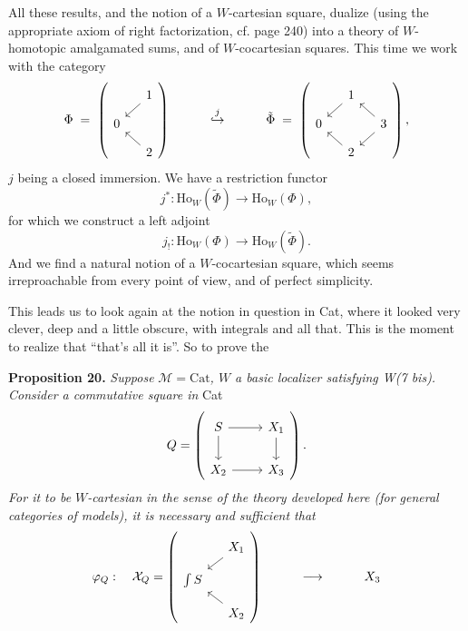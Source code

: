 \documentclass[11pt]{article}
\newcommand{\printedpage}[1]{\marginpar{\footnotesize p.~#1}}
\newcommand{\msp}[1]{\marginpar{\footnotesize [#1]}}
\newcommand{\Ho}{\mathrm{Ho}}
\begin{document}
\printedpage{170}

All these results, and the notion of a $W$-cartesian square, dualize (using the appropriate axiom of right factorization, cf. page 240) into a theory of $W$-homotopic amalgamated sums, and of $W$-cocartesian squares. This time we work with the category
\[
\Phi \;=\; \left(
\begin{tikzcd}[ampersand replacement=\&, row sep=small, column sep=small]
 \& 1 \arrow[dl] \\
0 \& \\
 \& 2 \arrow[ul]
\end{tikzcd}
\right)
\qquad\quad \overset{j}{\hookrightarrow} \qquad\quad
\tilde{\Phi} \;=\; \left(
\begin{tikzcd}[ampersand replacement=\&, row sep=small, column sep=small]
 \& 1 \arrow[dl] \& \\
0 \& \& 3 \arrow[ul] \arrow[dl] \\
 \& 2 \arrow[ul] \&
\end{tikzcd}
\right),
\]
$j$ being a closed immersion. We have a restriction functor
\[
j^* : \Ho_W(\tilde{\Phi}) \longrightarrow \Ho_W(\Phi),
\]
for which we construct a left adjoint
\[
j_! : \Ho_W(\Phi) \longrightarrow \Ho_W(\tilde{\Phi}).
\]
And we find a natural notion of a
\msp{page 262}
$W$-cocartesian square, which seems irreproachable from every point of view, and of perfect simplicity. %

This leads us to look again at the notion in question in Cat, where it looked very clever, deep and a little obscure, with integrals and all that. This is the moment to realize that ``that's all it is''. So to prove the

\textbf{Proposition 20.} \textit{Suppose} $\mathcal{M} = \mathrm{Cat}$\textit{, $W$ a basic localizer satisfying W(7 bis). Consider a commutative square in} Cat
\[
Q = \left(
\begin{tikzcd}[ampersand replacement=\&]
S \arrow[r] \arrow[d] \& X_1 \arrow[d] \\
X_2 \arrow[r] \& X_3
\end{tikzcd}
\right).
\]
\textit{For it to be $W$-cartesian} \textit{in the sense of the theory developed here (for general categories of models), it is necessary and sufficient that}
\[
\varphi_Q : \quad \mathcal{X}_Q = \left(
\begin{tikzcd}[ampersand replacement=\&, row sep=small, column sep=small]
 \& X_1 \arrow[dl] \\
\int S \& \\
 \& X_2 \arrow[ul]
\end{tikzcd}
\right) \qquad\quad \longrightarrow \qquad\quad X_3
\]
\end{document}
